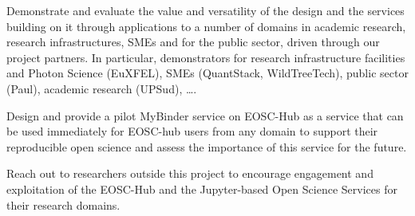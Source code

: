 \begin{compactenum}
\item \label{aim:demonstrators}%
  Demonstrate and evaluate the value and versatility of the design and
  the services building on it through applications to a number of
  domains in academic research, research infrastructures, SMEs and for
  the public sector, driven through our project partners. In
  particular, demonstrators for research infrastructure facilities and
  Photon Science (EuXFEL), SMEs (QuantStack, WildTreeTech), public
  sector (Paul), academic research (UPSud), \ldots.


\item \label{aim:binderservice}%
  Design and provide a pilot MyBinder service on EOSC-Hub as a service
  that can be used immediately for EOSC-hub users from any domain to
  support their reproducible open science and assess the importance of
  this service for the future.

\item \label{aim:outreach-and-engagement}%
  Reach out to researchers outside this project to encourage engagement
  and exploitation of the EOSC-Hub and the Jupyter-based Open Science
  Services for their research domains.


\end{compactenum}


